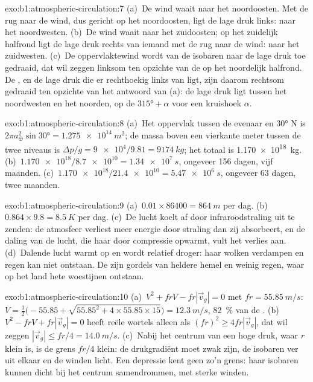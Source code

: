 \begin{solution}{exo:b1:atmospheric-circulation:7}
(a)~De wind waait naar het noordoosten. Met de rug naar de wind, dus gericht op het noordoosten, ligt de lage druk links: naar het noordwesten. (b)~De wind waait naar het zuidoosten; op het zuidelijk halfrond ligt de lage druk rechts van iemand met de rug naar de wind: naar het zuidwesten. (c)~De oppervlaktewind wordt van de isobaren naar de lage druk toe gedraaid, dat wil zeggen linksom ten opzichte van de  op het noordelijk halfrond. De , en de lage druk die er rechthoekig links van ligt, zijn daarom rechtsom gedraaid ten opzichte van het antwoord van (a): de lage druk ligt tussen het noordwesten en het noorden, op de  $\ang{315} + \alpha$ voor een kruishoek $\alpha$.
\end{solution}

\begin{solution}{exo:b1:atmospheric-circulation:8}
(a)~Het oppervlak tussen de evenaar en \ang{30} N is $2\pi a_\oplus^2\sin\ang{30} =
\qty{1.275e14}{m^2}$; de massa boven een vierkante meter tussen de twee niveaus is
$\Delta p/g = \num{9e4}/9.81 = \qty{9174}{kg}$; het totaal is
\qty{1.170e18}{kg}. (b)~$\num{1.170e18}/\num{8.7e10} = \qty{1.34e7}{s}$, ongeveer
\num{156} dagen, vijf maanden. (c)~$\num{1.170e18}/\num{21.4e10} = \qty{5.47e6}{s}$,
ongeveer \num{63} dagen, twee maanden.
\end{solution}

\begin{solution}{exo:b1:atmospheric-circulation:9}
(a)~$\num{0.01} \times \num{86400} = \qty{864}{m}$ per dag. (b)~$0.864 \times 9.8 =
\qty{8.5}{K}$ per dag. (c)~De lucht koelt af door infraroodstraling uit te zenden: de atmosfeer verliest meer energie door straling dan zij absorbeert, en de daling van de lucht, die haar door compressie opwarmt, vult het verlies aan. (d)~Dalende lucht warmt op en wordt relatief droger: haar wolken verdampen en regen kan niet ontstaan. De  zijn gordels van heldere hemel en weinig regen, waar op het land hete woestijnen ontstaan.
\end{solution}

\begin{solution}{exo:b1:atmospheric-circulation:10}
(a)~$V^2 + frV - fr|\vec v_g| = 0$ met $fr = \qty{55.85}{m/s}$:
$V = \tfrac12\bigl(-55.85 + \sqrt{55.85^2 + 4 \times 55.85 \times 15}\bigr) =
\qty{12.3}{m/s}$, \qty{82}{\percent} van de . (b)~$V^2 - frV +
fr|\vec v_g| = 0$ heeft reële wortels alleen als $(fr)^2 \geq 4fr|\vec v_g|$, dat wil zeggen
$|\vec v_g| \leq fr/4 = \qty{14.0}{m/s}$. (c)~Nabij het centrum van een hoge druk, waar $r$ klein is, is de grens $fr/4$ klein: de drukgradiënt moet zwak zijn, de isobaren ver uit elkaar en de winden licht. Een depressie kent geen zo'n grens: haar isobaren kunnen dicht bij het centrum samendrommen, met sterke winden.
\end{solution}

